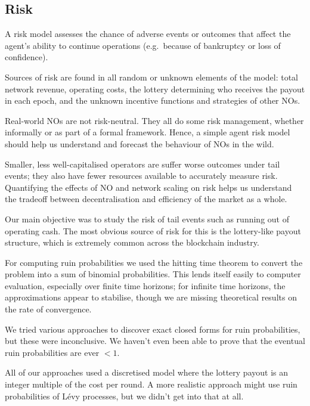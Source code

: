 \newpage
\subsection{Risk}
\label{section:risk}

\begin{notes}
  \item
    A risk model assesses the chance of adverse events or outcomes that affect the agent's ability to continue operations (e.g.~because of bankruptcy or loss of confidence).
  \item
    Sources of risk are found in all random or unknown elements of the model: total network revenue, operating costs, the lottery determining who receives the payout in each epoch, and the unknown incentive functions and strategies of other NOs.
  \item
    Real-world NOs are not risk-neutral. They all do some risk management, whether informally or as part of a formal framework.
    Hence, a simple agent risk model should help us understand and forecast the behaviour of NOs in the wild.

  \item
    Smaller, less well-capitalised operators are suffer worse outcomes under tail events; they also have fewer resources available to accurately measure risk.
    Quantifying the effects of NO and network scaling on risk helps us understand the tradeoff between decentralisation and efficiency of the market as a whole.

  \item
    Our main objective was to study the risk of tail events such as running out of operating cash.
    The most obvious source of risk for this is the lottery-like payout structure, which is extremely common across the blockchain industry.

  \item
    For computing ruin probabilities we used the hitting time theorem to convert the problem into a sum of binomial probabilities.
    This lends itself easily to computer evaluation, especially over finite time horizons; for infinite time horizons, the approximations appear to stabilise, though we are missing theoretical results on the rate of convergence.

  \item
    We tried various approaches to discover exact closed forms for ruin probabilities, but these were inconclusive.
    We haven't even been able to prove that the eventual ruin probabilities are ever $<1$.

  \item
    All of our approaches used a discretised model where the lottery payout is an integer multiple of the cost per round.
    A more realistic approach might use ruin probabilities of L\'evy processes, but we didn't get into that at all.
\end{notes}


